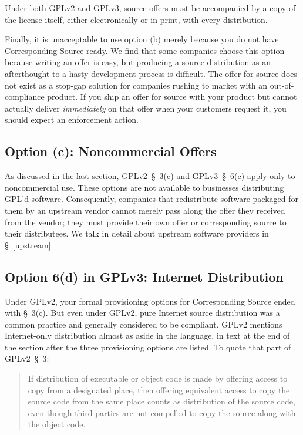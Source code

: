 Under both GPLv2 and GPLv3, source offers must be accompanied by a copy of
the license itself, either electronically or in print, with every
distribution.
 
Finally, it is unacceptable to use option (b) merely because you do not have
Corresponding Source ready.  We find that some companies choose this option
because writing an offer is easy, but producing a source distribution as
an afterthought to a hasty development process is difficult.  The offer
for source does not exist as a stop-gap solution for companies rushing to
market with an out-of-compliance product.  If you ship an offer for source
with your product but cannot actually deliver \emph{immediately} on that
offer when your customers request it, you should expect an enforcement
action.

\subsection{Option (c): Noncommercial Offers}

As discussed in the last section, GPLv2~\S~3(c) and GPLv3~\S~6(c) apply
only to noncommercial use.  These options are not available to businesses
distributing GPL'd software.  Consequently, companies that redistribute
software packaged for them by an upstream vendor cannot merely pass along
the offer they received from the vendor; they must provide their own offer
or corresponding source to their distributees.  We talk in detail about
upstream software providers in \S~\ref{upstream}.

\subsection{Option 6(d) in GPLv3: Internet Distribution}

Under GPLv2, your formal provisioning options for Corresponding Source
ended with \S~3(c).  But even under GPLv2, pure Internet source
distribution was a common practice and generally considered to be
compliant.  GPLv2 mentions Internet-only distribution almost as aside in
the language, in text at the end of the section after the three
provisioning options are listed.  To quote that part of GPLv2~\S~3:
\begin{quote}
If distribution of executable or object code is made by offering access to
copy from a designated place, then offering equivalent access to copy the
source code from the same place counts as distribution of the source code,
even though third parties are not compelled to copy the source along with
the object code.
\end{quote}


